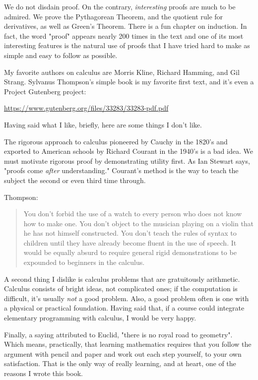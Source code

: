 \documentclass[11pt, oneside]{article}
\begin{document}
We do not disdain proof.  On the contrary, \emph{interesting} proofs are much to be admired.  We prove the Pythagorean Theorem, and the quotient rule for derivatives, as well as Green's Theorem.  There is a fun chapter on induction.  In fact, the word "proof" appears nearly 200 times in the text and one of its most interesting features is the natural use of proofs that I have tried hard to make as simple and easy to follow as possible.

My favorite authors on calculus are Morris Kline, Richard Hamming, and Gil Strang.  Sylvanus Thompson's simple book is my favorite first text, and it's even a Project Gutenberg project:

\url{https://www.gutenberg.org/files/33283/33283-pdf.pdf}

Having said what I like, briefly, here are some things I don't like.

The rigorous approach to calculus pioneered by Cauchy in the 1820's and exported to American schools by Richard Courant in the 1940's is a bad idea.  We must motivate rigorous proof by demonstrating utility first.  As Ian Stewart says, "proofs come \emph{after} understanding."  Courant's method is the way to teach the subject the second or even third time through.

Thompson:

\begin{quote}
You don't forbid the use of a watch to every person who does not know how to make one. You don't object to the musician playing on a violin that he has not himself constructed. You don't teach the rules of syntax to children until they have already become fluent in the use of speech. It would be equally absurd to require general rigid demonstrations to be expounded to beginners in the calculus.\end{quote}

A second thing I dislike is calculus problems that are gratuitously arithmetic.  Calculus consists of bright ideas, not complicated ones;  if the computation is difficult, it's usually \emph{not} a good problem.  Also, a good problem often is one with a physical or practical foundation.  Having said that, if a course could integrate elementary programming with calculus, I would be very happy.

Finally, a saying attributed to Euclid, "there is no royal road to geometry".  Which means, practically, that learning mathematics requires that you follow the argument with pencil and paper and work out each step yourself, to your own satisfaction.  That is the only way of really learning, and at heart, one of the reasons I wrote this book.
\end{document}
